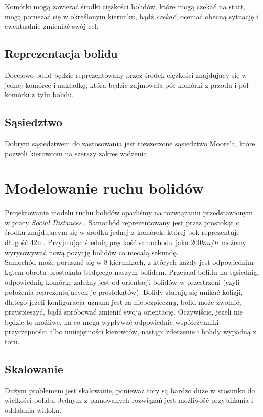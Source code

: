 \documentclass[12p]{extarticle}
\begin{document}
Komórki mogą zawierać środki ciężkości bolidów, które mogą czekać na start, mogą poruszać się w określonym kierunku, bądź \textit{czekać}, oceniać obecną sytuację i ewentualnie zmieniać swój cel. 

\subsection{Reprezentacja bolidu}
Docelowo bolid będzie reprezentowany przez środek ciężkości znajdujący się w jednej komórce i nakładkę, która będzie zajmowała pół komórki z przodu i pół komórki z tyłu bolidu.

\subsection{Sąsiedztwo}
Dobrym sąsiedztwem do zastosowania jest rozszerzone sąsiedztwo Moore'a, które pozwoli kierowcom na szerszy zakres widzenia.

\section{Modelowanie ruchu bolidów}
Projektowanie modelu ruchu bolidów oparliśmy na rozwiązaniu przedstawionym w pracy \textit{Social Distances} \cite{was}. Samochód reprezentowany jest przez prostokąt o środku znajdującym się w środku jednej z komórek, której bok reprezentuje długość 42m. Przyjmując średnią prędkość samochodu jako $200 km/h$ możemy wyrysowywać nową pozycję bolidów co niecałą sekundę. \\

Samochód może poruszać się w 8 kierunkach, z których każdy jest odpowiednim kątem obrotu prostokąta będącego naszym bolidem. Przejazd bolidu na sąsiednią, odpowiednią komórkę zależny jest od orientacji bolidów w przestrzeni (czyli położenia reprezentujących je prostokątów). Bolidy starają się unikać kolizji, dlatego jeżeli konfiguracja uznana jest za niebezpieczną, bolid może zwolnić, przyspieszyć, bądź spróbować zmienić swoją orientację. Oczywiście, jeżeli nie będzie to możliwe, na co mogą wypływać odpowiednie współczynniki przyczepności albo umiejętności kierowców, nastąpi zderzenie i bolidy wypadną z toru.   \\

\subsection{Skalowanie}
Dużym problemem jest skalowanie, ponieważ tory są bardzo duże w stosunku do wielkości bolidu. Jednym z planowanych rozwiązań jest możliwość przybliżania i oddalania widoku.
\end{document}
